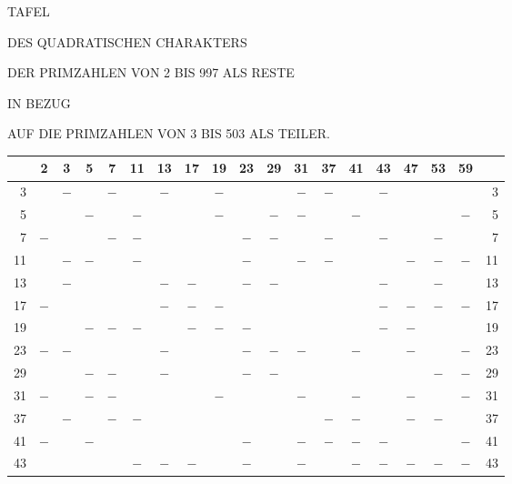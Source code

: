 \clearpage
{}%
\renewcommand{\BookRunningTitle}{Tafel des quadratischen Charakters}
\begin{center}
{\Large TAFEL}\par\bigskip
DES QUADRATISCHEN CHARAKTERS\par\bigskip
DER PRIMZAHLEN VON 2 BIS 997 ALS RESTE\par\bigskip
IN BEZUG\par\bigskip
AUF DIE PRIMZAHLEN VON 3 BIS 503 ALS TEILER.
\end{center}
\clearpage

%
\begin{center}\begingroup\fontsize{8}{10.5}\selectfont\setlength{\tabcolsep}{2pt}
\begin{tabular}{r|c|c|c|c|c|c|c|c|c|c|c|c|c|c|c|c|c|r}
\hline
 & 2 & 3 & 5 & 7 & 11 & 13 & 17 & 19 & 23 & 29 & 31 & 37 & 41 & 43 & 47 & 53 & 59 & \\
\hline
3 &  & $-$ &  & $-$ &  & $-$ &  & $-$ &  &  & $-$ & $-$ &  & $-$ &  &  &  & 3\\
5 &  &  & $-$ &  & $-$ &  &  & $-$ &  & $-$ & $-$ &  & $-$ &  &  &  & $-$ & 5\\
7 & $-$ &  &  & $-$ & $-$ &  &  &  & $-$ & $-$ &  & $-$ &  & $-$ &  & $-$ &  & 7\\
11 &  & $-$ & $-$ &  & $-$ &  &  &  & $-$ &  & $-$ & $-$ &  &  & $-$ & $-$ & $-$ & 11\\
13 &  & $-$ &  &  &  & $-$ & $-$ &  & $-$ & $-$ &  &  &  & $-$ &  & $-$ &  & 13\\
17 & $-$ &  &  &  &  & $-$ & $-$ & $-$ &  &  &  &  &  & $-$ & $-$ & $-$ & $-$ & 17\\
19 &  &  & $-$ & $-$ & $-$ &  & $-$ & $-$ & $-$ &  &  &  &  & $-$ & $-$ &  &  & 19\\
23 & $-$ & $-$ &  &  &  & $-$ &  &  & $-$ & $-$ & $-$ &  & $-$ &  & $-$ &  & $-$ & 23\\
29 &  &  & $-$ & $-$ &  & $-$ &  &  & $-$ & $-$ &  &  &  &  &  & $-$ & $-$ & 29\\
31 & $-$ &  & $-$ & $-$ &  &  &  & $-$ &  &  & $-$ &  & $-$ &  & $-$ &  & $-$ & 31\\
37 &  & $-$ &  & $-$ & $-$ &  &  &  &  &  &  & $-$ & $-$ &  & $-$ & $-$ &  & 37\\
41 & $-$ &  & $-$ &  &  &  &  &  & $-$ &  & $-$ & $-$ & $-$ & $-$ &  &  & $-$ & 41\\
43 &  &  &  &  & $-$ & $-$ & $-$ &  & $-$ &  & $-$ &  & $-$ & $-$ & $-$ & $-$ & $-$ & 43\\

\end{tabular}
\end{center}
